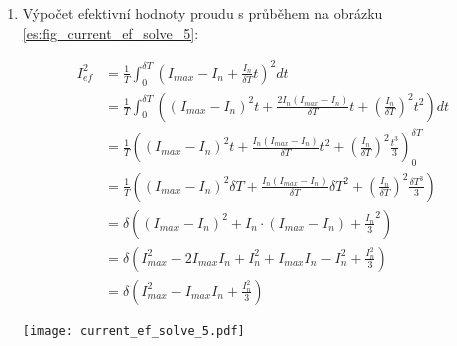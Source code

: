 \begin{enumerate}
      \item Výpočet efektivní hodnoty proudu s průběhem na obrázku \ref{es:fig_current_ef_solve_5}:
      
        \setlength{\parindent}{-10mm}
        \begin{minipage}[b]{0.6\textwidth}%
          \begin{align*}
            I_{ef}^2 
              &=  \frac{1}{T}\int_0^{\delta T}\left(I_{max}-I_n + 
                  \frac{I_n}{\delta T}t\right)^2dt                                 \\                   
              &=  \frac{1}{T}\int_0^{\delta T}\left((I_{max}-I_n)^2t + 
                  \frac{2I_n(I_{max}-I_n)}{\delta T}t +
                 (\frac{I_n}{\delta T})^2t^2\right)dt                              \\ 
              &=  \frac{1}{T}\left((I_{max}-I_n)^2t +
                  \frac{I_n(I_{max}-I_n)}{\delta T}t^2 +
                 (\frac{I_n}{\delta T})^2\frac{t^3}{3}\right)_0^{\delta T}         \\ 
              &=  \frac{1}{T}\left((I_{max}-I_n)^2\delta T +
                  \frac{I_n(I_{max}-I_n)}{\delta T}\delta T^2 + 
                 (\frac{I_n}{\delta T})^2\frac{\delta T^3}{3}\right)               \\  
              &=  \delta\left((I_{max} - I_n)^2 + I_n\cdot(I_{max}-I_n) +
                  \frac{I_n}{3}^2\right)                                           \\  
              &=  \delta\left(I_{max}^2-2I_{max}I_n+I_{n}^2 + I_{max}I_n-I_n^2 +
                  \frac{I_n^2}{3} \right)                                          \\ 
              &=  \delta\left(I_{max}^2-I_{max}I_n+\frac{I_n^2}{3}\right)
          \end{align*}
        \end{minipage} %
        \hspace{0.05\textwidth}
        \begin{minipage}[b]{0.3\textwidth}%
          \texttt{[image: current\_ef\_solve\_5.pdf]}
          \label{es:fig_current_ef_solve_5}
        \end{minipage}\newline
        

\end{enumerate}

